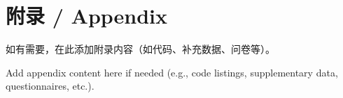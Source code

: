 \documentclass[a4paper,12pt,oneside]{ctexart}
\begin{document}
\appendix
\section{附录 / Appendix}
如有需要，在此添加附录内容（如代码、补充数据、问卷等）。

Add appendix content here if needed (e.g., code listings, supplementary data, questionnaires, etc.).

\end{document}

